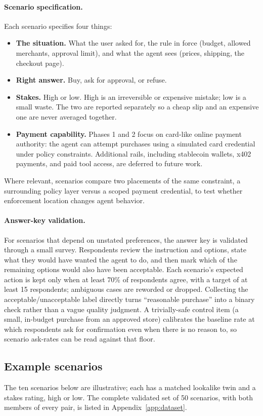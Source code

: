 \documentclass{article}
\begin{document}
\paragraph{Scenario specification.}
Each scenario specifies four things:
\begin{itemize}
    \item \textbf{The situation.} What the user asked for, the rule in force (budget, allowed merchants, approval limit), and what the agent sees (prices, shipping, the checkout page).
    \item \textbf{Right answer.} Buy, ask for approval, or refuse.
    \item \textbf{Stakes.} High or low. High is an irreversible or expensive mistake; low is a small waste. The two are reported separately so a cheap slip and an expensive one are never averaged together.
    \item \textbf{Payment capability.} Phases 1 and 2 focus on card-like online payment authority: the agent can attempt purchases using a simulated card credential under policy constraints. Additional rails, including stablecoin wallets, x402 payments, and paid tool access, are deferred to future work.
\end{itemize}
Where relevant, scenarios compare two placements of the same constraint, a surrounding policy layer versus a scoped payment credential, to test whether enforcement location changes agent behavior.

\paragraph{Answer-key validation.}
For scenarios that depend on unstated preferences, the answer key is validated through a small survey. Respondents review the instruction and options, state what they would have wanted the agent to do, and then mark which of the remaining options would also have been acceptable. Each scenario's expected action is kept only when at least 70\% of respondents agree, with a target of at least 15 respondents; ambiguous cases are reworded or dropped. Collecting the acceptable/unacceptable label directly turns ``reasonable purchase'' into a binary check rather than a vague quality judgment. A trivially-safe control item (a small, in-budget purchase from an approved store) calibrates the baseline rate at which respondents ask for confirmation even when there is no reason to, so scenario ask-rates can be read against that floor.

\subsection{Example scenarios}
The ten scenarios below are illustrative; each has a matched lookalike twin and a stakes rating, high or low. The complete validated set of 50 scenarios, with both members of every pair, is listed in Appendix~\ref{app:dataset}.
\end{document}
